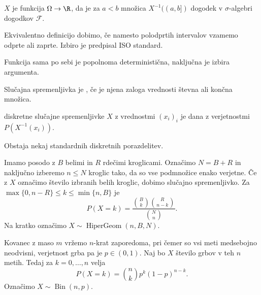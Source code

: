 
\begin{definicija}
   $X$ je funkcija $\Omega \to \R$, da je za $a <
  b$ množica $X^{-1}((a, b])$ dogodek v $\sigma$-algebri dogodkov $\mathcal{F}$.
\end{definicija}

\begin{opomba}
  Ekvivalentno definicijo dobimo, če namesto polodprtih intervalov vzamemo
  odprte ali zaprte.
  Izbiro je predpisal ISO standard.
\end{opomba}

\begin{opomba}
  Funkcija sama po sebi je popolnoma deterministična, naključna je izbira
  argumenta.
\end{opomba}

\begin{definicija}
  Slučajna spremenljivka je , če je njena zaloga vrednosti
  števna ali končna množica.
\end{definicija}

\begin{definicija}
   diskretne slučajne spremenljivke $X$ z vrednostmi
  $(x_i)_i$ je dana z verjetnostmi $P(X^{-1}(x_i))$.
\end{definicija}


Obstaja nekaj standardnih diskretnih porazdelitev.

\begin{primer}
  Imamo posodo z $B$ belimi in $R$ rdečimi kroglicami.
  Označimo $N = B+R$ in naključno izberemo $n \le N$ kroglic tako, da so vse
  podmnožice enako verjetne.
  Če z $X$ označimo število izbranih belih kroglic, dobimo slučajno
  spremenljivko.
  Za $\max\{0, n-R\} \le k \le \min\{n, B\}$ je
  \[
	P(X = k) = \frac{\binom{B}{k} \binom{R}{n-k}}{\binom{N}{n}}.
  \]
  Na kratko označimo $X \sim \operatorname{HiperGeom}(n, B, N)$.
\end{primer}


\begin{primer}
  Kovanec z maso $m$ vržemo $n$-krat zaporedoma, pri čemer so vsi meti
  medsebojno neodvisni, verjetnost grba pa je $p \in (0,1)$.
  Naj bo $X$ število grbov v teh $n$ metih.
  Tedaj za $k = 0, \ldots, n$ velja
  \[
	P(X = k) = \binom{n}{k} p^k (1-p)^{n-k}.
  \]
  Označimo $X \sim \operatorname{Bin}(n, p)$.
\end{primer}

